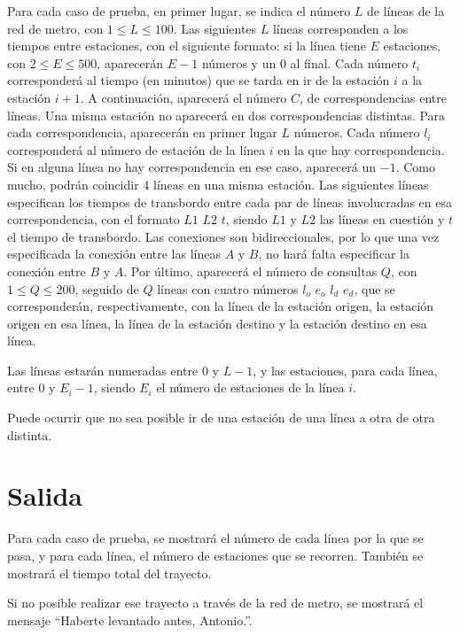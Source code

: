 \documentclass[a4paper]{article}
\begin{document}
Para cada caso de prueba, en primer lugar, se indica el número \(L\) de líneas de la red de metro, con \(1 \leq L \leq 100\). Las siguientes \(L\) líneas corresponden a los tiempos entre estaciones, con el siguiente formato: si la línea tiene \(E\) estaciones, con \(2 \leq E \leq 500\), aparecerán \(E - 1\) números y un \(0\) al final. Cada número \(t_i\) corresponderá al tiempo (en minutos) que se tarda en ir de la estación \(i\) a la estación \(i + 1\). A continuación, aparecerá el número \(C\), de correspondencias entre líneas. Una misma estación no aparecerá en dos correspondencias distintas. Para cada correspondencia, aparecerán en primer lugar \(L\) números. Cada número \(l_i\) corresponderá al número de estación de la línea \(i\) en la que hay correspondencia. Si en alguna línea no hay correspondencia en ese caso, aparecerá un \(-1\). Como mucho, podrán coincidir 4 líneas en una misma estación. Las siguientes líneas especifican los tiempos de transbordo entre cada par de líneas involucradas en esa correspondencia, con el formato \(L1\) \(L2\) \(t\), siendo \(L1\) y \(L2\) las líneas en cuestión y \(t\) el tiempo de transbordo. Las conexiones son bidireccionales, por lo que una vez especificada la conexión entre las líneas \(A\) y \(B\), no hará falta especificar la conexión entre \(B\) y \(A\). Por último, aparecerá el número de consultas \(Q\), con \(1 \leq Q \leq 200\), seguido de \(Q\) líneas con cuatro números \(l_o\) \(e_o\) \(l_d\) \(e_d\), que se corresponderán, respectivamente, con la línea de la estación origen, la estación origen en esa línea, la línea de la estación destino y la estación destino en esa línea.

Las líneas estarán numeradas entre \(0\) y \(L - 1\), y las estaciones, para cada línea, entre \(0\) y \(E_i - 1\), siendo \(E_i\) el número de estaciones de la línea \(i\).

Puede ocurrir que no sea posible ir de una estación de una línea a otra de otra distinta.

\section*{Salida}

Para cada caso de prueba, se mostrará el número de cada línea por la que se pasa, y para cada línea, el número de estaciones que se recorren. También se mostrará el tiempo total del trayecto.

Si no posible realizar ese trayecto a través de la red de metro, se mostrará el mensaje ``Haberte levantado antes, Antonio.''.
\end{document}
